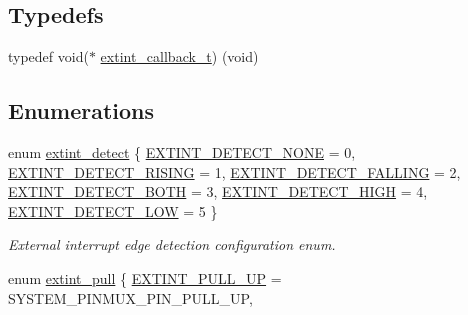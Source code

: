 \subsection*{Typedefs}
\begin{DoxyCompactItemize}
\item 
typedef void($\ast$ \mbox{\hyperlink{group__asfdoc__sam0__extint__group_ga0faa88198c196060baeecb40061daaa5}{extint\+\_\+callback\+\_\+t}}) (void)
\end{DoxyCompactItemize}
\subsection*{Enumerations}
\begin{DoxyCompactItemize}
\item 
enum \mbox{\hyperlink{group__asfdoc__sam0__extint__group_ga920ab9931e047b548d07ad29dedfcca2}{extint\+\_\+detect}} \{ \newline
\mbox{\hyperlink{group__asfdoc__sam0__extint__group_gga920ab9931e047b548d07ad29dedfcca2a6505c5a81f362fc6d2146395fa5e0641}{E\+X\+T\+I\+N\+T\+\_\+\+D\+E\+T\+E\+C\+T\+\_\+\+N\+O\+NE}} = 0, 
\mbox{\hyperlink{group__asfdoc__sam0__extint__group_gga920ab9931e047b548d07ad29dedfcca2a62003fada64b948bb611011f2179b2fb}{E\+X\+T\+I\+N\+T\+\_\+\+D\+E\+T\+E\+C\+T\+\_\+\+R\+I\+S\+I\+NG}} = 1, 
\mbox{\hyperlink{group__asfdoc__sam0__extint__group_gga920ab9931e047b548d07ad29dedfcca2a0477f603ca427098cd743a9919c89f43}{E\+X\+T\+I\+N\+T\+\_\+\+D\+E\+T\+E\+C\+T\+\_\+\+F\+A\+L\+L\+I\+NG}} = 2, 
\mbox{\hyperlink{group__asfdoc__sam0__extint__group_gga920ab9931e047b548d07ad29dedfcca2aa7386678eccf0e246afa75614bfd8841}{E\+X\+T\+I\+N\+T\+\_\+\+D\+E\+T\+E\+C\+T\+\_\+\+B\+O\+TH}} = 3, 
\newline
\mbox{\hyperlink{group__asfdoc__sam0__extint__group_gga920ab9931e047b548d07ad29dedfcca2a9660006ada972d5b562adc15bc787767}{E\+X\+T\+I\+N\+T\+\_\+\+D\+E\+T\+E\+C\+T\+\_\+\+H\+I\+GH}} = 4, 
\mbox{\hyperlink{group__asfdoc__sam0__extint__group_gga920ab9931e047b548d07ad29dedfcca2aace71e1f8f4ea192934bc54efa3e7af3}{E\+X\+T\+I\+N\+T\+\_\+\+D\+E\+T\+E\+C\+T\+\_\+\+L\+OW}} = 5
 \}
\begin{DoxyCompactList}\small\item\em External interrupt edge detection configuration enum. \end{DoxyCompactList}\item 
enum \mbox{\hyperlink{group__asfdoc__sam0__extint__group_ga01b49a5a87ca71359c5a9bc2ee02853e}{extint\+\_\+pull}} \{ \mbox{\hyperlink{group__asfdoc__sam0__extint__group_gga01b49a5a87ca71359c5a9bc2ee02853ea622ad8b9955fb50c31f1b98df6318819}{E\+X\+T\+I\+N\+T\+\_\+\+P\+U\+L\+L\+\_\+\+UP}} = S\+Y\+S\+T\+E\+M\+\_\+\+P\+I\+N\+M\+U\+X\+\_\+\+P\+I\+N\+\_\+\+P\+U\+L\+L\+\_\+\+UP, 

\end{DoxyCompactItemize}
